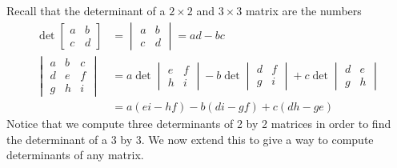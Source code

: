 \mysubsection{\ideadet}
Recall that the determinant of a {$2\times 2$} and {$3\times 3$} matrix are the numbers 
\begin{align*}
\det\begin{bmatrix}a&b\\c&d\end{bmatrix} &=\begin{vmatrix}a&b\\c&d\end{vmatrix} = ad-bc\\
\begin{vmatrix}a&b&c\\d&e&f\\g&h&i\end{vmatrix} &= a\det\begin{vmatrix}e&f\\h&i\end{vmatrix} -b\det\begin{vmatrix}d&f\\g&i\end{vmatrix} +c\det\begin{vmatrix}d&e\\g&h\end{vmatrix}\\
&=a(ei-hf)-b(di-gf)+c(dh-ge)
\end{align*}
Notice that we compute three determinants of 2 by 2 matrices in order to find the determinant of a 3 by 3. We now extend this to give a way to compute determinants of any matrix.


